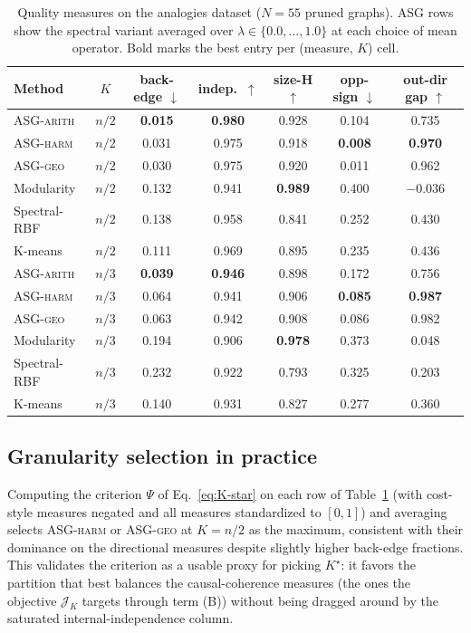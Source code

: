 \documentclass[table, 11pt]{article}
\begin{document}
\begin{table}[t]
\centering
\caption{Quality measures on the analogies dataset ($N=55$ pruned
graphs). ASG rows show the spectral variant averaged over
$\lambda \in \{0.0, \ldots, 1.0\}$ at each choice of mean operator.
Bold marks the best entry per (measure, $K$) cell.}
\label{tab:main}
\small
\begin{tabular}{@{}lcccccc@{}}
\toprule
\textbf{Method} & $K$ & back-edge $\downarrow$ & indep.\ $\uparrow$ & size-H $\uparrow$ & opp-sign $\downarrow$ & out-dir gap $\uparrow$ \\
\midrule
\textsc{ASG-arith} & $n/2$ & \textbf{0.015} & \textbf{0.980} & 0.928 & 0.104 & 0.735 \\
\textsc{ASG-harm}  & $n/2$ & 0.031 & 0.975 & 0.918 & \textbf{0.008} & \textbf{0.970} \\
\textsc{ASG-geo}   & $n/2$ & 0.030 & 0.975 & 0.920 & 0.011 & 0.962 \\
Modularity         & $n/2$ & 0.132 & 0.941 & \textbf{0.989} & 0.400 & $-0.036$ \\
Spectral-RBF       & $n/2$ & 0.138 & 0.958 & 0.841 & 0.252 & 0.430 \\
K-means            & $n/2$ & 0.111 & 0.969 & 0.895 & 0.235 & 0.436 \\
\midrule
\textsc{ASG-arith} & $n/3$ & \textbf{0.039} & \textbf{0.946} & 0.898 & 0.172 & 0.756 \\
\textsc{ASG-harm}  & $n/3$ & 0.064 & 0.941 & 0.906 & \textbf{0.085} & \textbf{0.987} \\
\textsc{ASG-geo}   & $n/3$ & 0.063 & 0.942 & 0.908 & 0.086 & 0.982 \\
Modularity         & $n/3$ & 0.194 & 0.906 & \textbf{0.978} & 0.373 & 0.048 \\
Spectral-RBF       & $n/3$ & 0.232 & 0.922 & 0.793 & 0.325 & 0.203 \\
K-means            & $n/3$ & 0.140 & 0.931 & 0.827 & 0.277 & 0.360 \\
\bottomrule
\end{tabular}
\end{table}

\subsection{Granularity selection in practice}

Computing the criterion $\Psi$ of Eq.~\eqref{eq:K-star} on each row
of Table~\ref{tab:main} (with cost-style measures negated and all
measures standardized to $[0,1]$) and averaging selects
\textsc{ASG-harm} or \textsc{ASG-geo} at $K=n/2$ as the maximum,
consistent with their dominance on the directional measures despite
slightly higher back-edge fractions. This validates the criterion as
a usable proxy for picking $K^\star$: it favors the partition that
best balances the causal-coherence measures (the ones the objective
$\mathcal{J}_K$ targets through term (B)) without being dragged
around by the saturated internal-independence column.
\end{document}
